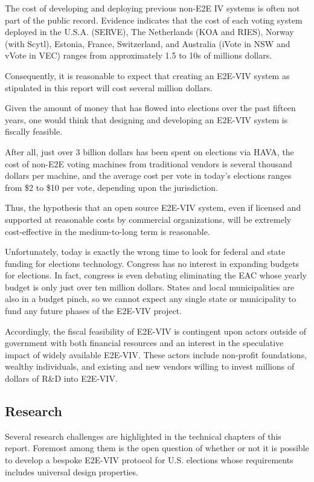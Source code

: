 The cost of developing and deploying previous non-E2E IV systems is
often not part of the public record.  Evidence indicates that the cost
of each voting system deployed in the U.S.A. (SERVE), The Netherlands
(KOA and RIES), Norway (with Scytl), Estonia, France, Switzerland, and
Australia (iVote in NSW and vVote in VEC) ranges from approximately
1.5 to 10s of millions dollars.  

Consequently, it is reasonable to expect that creating an E2E-VIV
system as stipulated in this report will cost several million dollars.

Given the amount of money that has flowed into elections over the past
fifteen years, one would think that designing and developing an
E2E-VIV system is fiscally feasible.

After all, just over 3 billion dollars has been spent on elections via
HAVA, the cost of non-E2E voting machines from traditional vendors is
several thousand dollars per machine, and the average cost per vote
in today's elections ranges from \$2 to \$10 per vote, depending
upon the jurisdiction.  

Thus, the hypothesis that an open source E2E-VIV system, even if
licensed and supported at reasonable costs by commercial
organizations, will be extremely cost-effective in the medium-to-long
term is reasonable.

Unfortunately, today is exactly the wrong time to look for federal and
state funding for elections technology.  Congress has no interest in
expanding budgets for elections. In fact, congress is even debating
eliminating the EAC whose yearly budget is only just over ten million
dollars. States and local municipalities are also in a budget pinch,
so we cannot expect any single state or municipality to fund any
future phases of the E2E-VIV project.

Accordingly, the fiscal feasibility of E2E-VIV is contingent upon
actors outside of government with both financial resources and an
interest in the speculative impact of widely available E2E-VIV.  These
actors include non-profit foundations, wealthy individuals, and
existing and new vendors willing to invest millions of dollars of R\&D
into E2E-VIV.

\subsection{Research}

Several research challenges are highlighted in the technical chapters
of this report.  Foremost among them is the open question of whether or
not it is possible to develop a bespoke E2E-VIV protocol for
U.S. elections whose requirements includes universal design
properties. 

